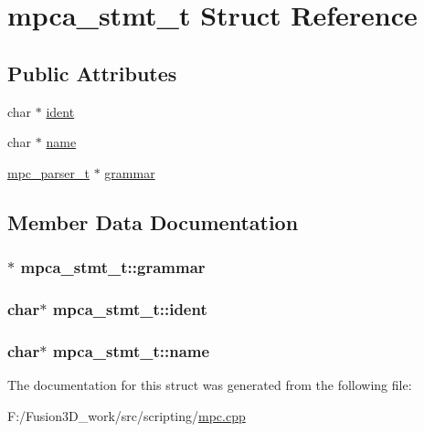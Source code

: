 \hypertarget{structmpca__stmt__t}{}\section{mpca\+\_\+stmt\+\_\+t Struct Reference}
\label{structmpca__stmt__t}
\subsection*{Public Attributes}
\begin{DoxyCompactItemize}
\item 
char $\ast$ \hyperlink{structmpca__stmt__t_acaab4ecbf5a29e98b1c53c4521abe8f7}{ident}
\item 
char $\ast$ \hyperlink{structmpca__stmt__t_afa5a441d7b077ccd7d515bdc2f53670b}{name}
\item 
\hyperlink{structmpc__parser__t}{mpc\+\_\+parser\+\_\+t} $\ast$ \hyperlink{structmpca__stmt__t_a41c7891fa0c8f387c40823c77bf77edf}{grammar}
\end{DoxyCompactItemize}


\subsection{Member Data Documentation}
\hypertarget{structmpca__stmt__t_a41c7891fa0c8f387c40823c77bf77edf}{}
\subsubsection[{grammar}]{$\ast$ mpca\+\_\+stmt\+\_\+t\+::grammar}\label{structmpca__stmt__t_a41c7891fa0c8f387c40823c77bf77edf}
\hypertarget{structmpca__stmt__t_acaab4ecbf5a29e98b1c53c4521abe8f7}{}
\subsubsection[{ident}]{\setlength{\rightskip}{0pt plus 5cm}char$\ast$ mpca\+\_\+stmt\+\_\+t\+::ident}\label{structmpca__stmt__t_acaab4ecbf5a29e98b1c53c4521abe8f7}
\hypertarget{structmpca__stmt__t_afa5a441d7b077ccd7d515bdc2f53670b}{}
\subsubsection[{name}]{\setlength{\rightskip}{0pt plus 5cm}char$\ast$ mpca\+\_\+stmt\+\_\+t\+::name}\label{structmpca__stmt__t_afa5a441d7b077ccd7d515bdc2f53670b}


The documentation for this struct was generated from the following file\+:\begin{DoxyCompactItemize}
\item 
F\+:/\+Fusion3\+D\+\_\+work/src/scripting/\hyperlink{mpc_8cpp}{mpc.\+cpp}\end{DoxyCompactItemize}
